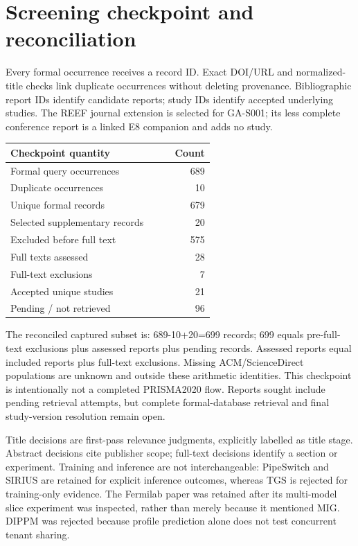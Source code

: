 \documentclass[12pt,a 4paper]{article}
\begin{document}
\section{Screening checkpoint and reconciliation}
Every formal occurrence receives a record ID. Exact DOI/URL and normalized-title checks link duplicate occurrences without deleting provenance. Bibliographic report IDs identify candidate reports; study IDs identify accepted underlying studies. The REEF journal extension is selected for GA-S001; its less complete conference report is a linked E8 companion and adds no study.
\begin{longtable}{P{0.7\linewidth}r}\toprule Checkpoint quantity & Count\\\midrule\endhead
Formal query occurrences & 689\\
Duplicate occurrences & 10\\
Unique formal records & 679\\
Selected supplementary records & 20\\
Excluded before full text & 575\\
Full texts assessed & 28\\
Full-text exclusions & 7\\
Accepted unique studies & 21\\
Pending / not retrieved & 96\\
\bottomrule\end{longtable}
The reconciled captured subset is: 689-10+20=699 records; 699 equals pre-full-text exclusions plus assessed reports plus pending records. Assessed reports equal included reports plus full-text exclusions. Missing ACM/ScienceDirect populations are unknown and outside these arithmetic identities. This checkpoint is intentionally not a completed PRISMA2020 flow. Reports sought include pending retrieval attempts, but complete formal-database retrieval and final study-version resolution remain open.

Title decisions are first-pass relevance judgments, explicitly labelled as title stage. Abstract decisions cite publisher scope; full-text decisions identify a section or experiment. Training and inference are not interchangeable: PipeSwitch and SIRIUS are retained for explicit inference outcomes, whereas TGS is rejected for training-only evidence. The Fermilab paper was retained after its multi-model slice experiment was inspected, rather than merely because it mentioned MIG. DIPPM was rejected because profile prediction alone does not test concurrent tenant sharing.
\end{document}
